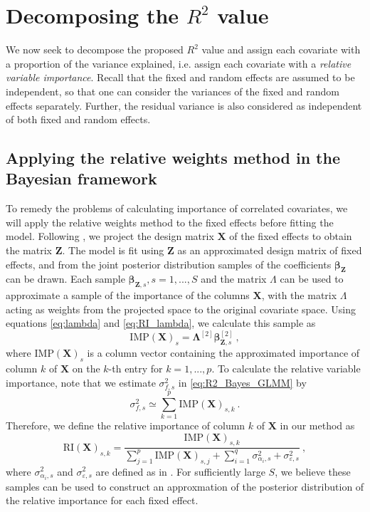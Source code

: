     
    


\section{Decomposing the $R^2$ value}
We now seek to decompose the proposed $R^2$ value and assign each covariate with a proportion of the variance explained, i.e. assign each covariate with a \textit{relative variable importance}. Recall that the fixed and random effects are assumed to be independent, so that one can consider the variances of the fixed and random effects separately. Further, the residual variance is also considered as independent of both fixed and random effects. 
\subsection{Applying the relative weights method in the Bayesian framework}
To remedy the problems of calculating importance of correlated covariates, we will apply the relative weights method to the fixed effects before fitting the model. Following , we project the design matrix $\mathbf{X}$ of the fixed effects to obtain the matrix $\mathbf{Z}$. The model is fit using $\mathbf{Z}$ as an approximated design matrix of fixed effects, and from the joint posterior distribution samples of the coefficients $\boldsymbol{\beta}_{\mathbf{Z}}$ can be drawn. Each sample $\boldsymbol{\beta}_{\mathbf{Z}, s}, s=1, ..., S$ and the matrix $\Lambda$ can be used to approximate a sample of the importance of the columns $\mathbf{X}$, with the matrix $\Lambda$ acting as weights from the projected space to the original covariate space. Using equations \eqref{eq:lambda} and \eqref{eq:RI_lambda}, we calculate this sample as
\begin{equation}
    \text{IMP}(\mathbf{X})_s = \boldsymbol{\Lambda}^{[2]} \boldsymbol{\beta}_{\mathbf{Z}, s}^{[2]} \ ,
\end{equation}
where $\text{IMP}(\mathbf{X})_s$ is a column vector containing the approximated importance of column $k$ of $\mathbf{X}$ on the $k$-th entry for $k=1, ..., p$. To calculate the relative variable importance, note that we estimate $\sigma^2_{f, s}$ in \eqref{eq:R2_Bayes_GLMM} by
\begin{equation}
    \sigma^2_{f, s} \simeq \sum_{k=1}^{p}\text{IMP}(\mathbf{X})_{s, k}  \ . 
\end{equation}
Therefore, we define the relative importance of column $k$ of $\mathbf{X}$ in our method as
\begin{equation}
    \text{RI}(\mathbf{X})_{s, k} = \frac{\text{IMP}(\mathbf{X})_{s, k}}{\sum_{j=1}^{p}\text{IMP}(\mathbf{X})_{s, j} + \sum_{i=1}^q \sigma_{\alpha_i, s}^2 + \sigma_{\varepsilon, s}^2} \ ,
\end{equation}
where $\sigma_{\alpha_i, s}^2$ and  $\sigma_{\varepsilon, s}^2$ are defined as in .
For sufficiently large $S$, we believe these samples can be used to construct an approxmation of the posterior distribution of the relative importance for each fixed effect. 

